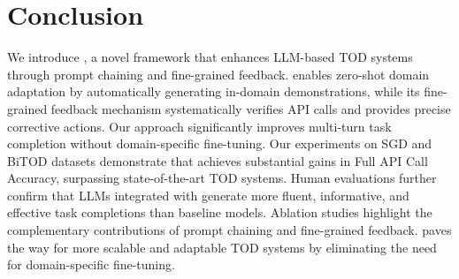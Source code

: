 \vspace{-5pt}
\section{Conclusion} 
\vspace{-5pt}
We introduce {\ours}, a novel framework that enhances LLM-based TOD systems through prompt chaining and fine-grained feedback. {\ours} enables zero-shot domain adaptation by automatically generating in-domain demonstrations, while its fine-grained feedback mechanism systematically verifies API calls and provides precise corrective actions. Our approach significantly improves multi-turn task completion without domain-specific fine-tuning.
Our experiments on SGD and BiTOD datasets demonstrate that {\ours} achieves substantial gains in Full API Call Accuracy, surpassing state-of-the-art TOD systems. Human evaluations further confirm that LLMs integrated with {\ours} generate more fluent, informative, and effective task completions than baseline models. Ablation studies highlight the complementary contributions of prompt chaining and fine-grained feedback.
{\ours} paves the way for more scalable and adaptable TOD systems by eliminating the need for domain-specific fine-tuning.










